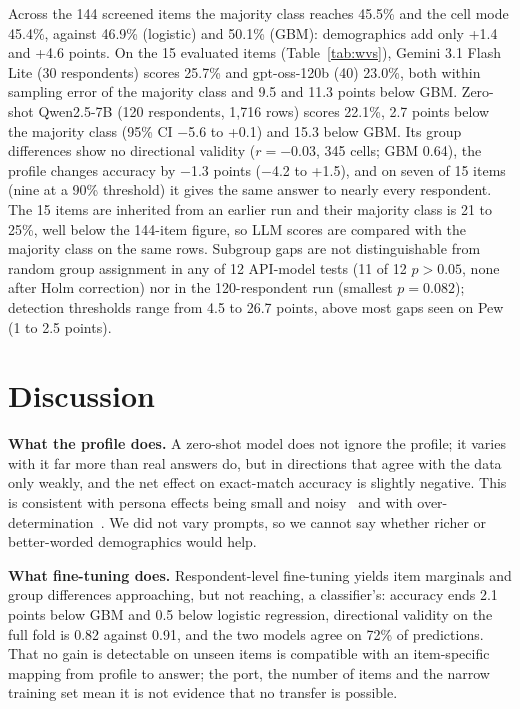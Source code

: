 \documentclass[conference]{IEEEtran}
\begin{document}
Across the 144 screened items the majority class reaches 45.5\% and the cell mode 45.4\%, against 46.9\% (logistic) and 50.1\% (GBM): demographics add only +1.4 and +4.6 points. On the 15 evaluated items (Table~\ref{tab:wvs}), Gemini 3.1 Flash Lite (30 respondents) scores 25.7\% and gpt-oss-120b (40) 23.0\%, both within sampling error of the majority class and 9.5 and 11.3 points below GBM. Zero-shot Qwen2.5-7B (120 respondents, 1{,}716 rows) scores 22.1\%, 2.7 points below the majority class (95\% CI $-$5.6 to +0.1) and 15.3 below GBM. Its group differences show no directional validity ($r={-0.03}$, 345 cells; GBM 0.64), the profile changes accuracy by $-$1.3 points ($-$4.2 to +1.5), and on seven of 15 items (nine at a 90\% threshold) it gives the same answer to nearly every respondent. The 15 items are inherited from an earlier run and their majority class is 21 to 25\%, well below the 144-item figure, so LLM scores are compared with the majority class on the same rows. Subgroup gaps are not distinguishable from random group assignment in any of 12 API-model tests (11 of 12 $p>0.05$, none after Holm correction) nor in the 120-respondent run (smallest $p=0.082$); detection thresholds range from 4.5 to 26.7 points, above most gaps seen on Pew (1 to 2.5 points).

\begin{table}[!t]
\caption{WVS-7 India, 15 items: zero-shot LLM accuracy against baselines on the same rows (95\% respondent-bootstrap CIs).}
\label{tab:wvs}
\centering
\scriptsize

\end{table}

\section{Discussion}

\textbf{What the profile does.} A zero-shot model does not ignore the profile; it varies with it far more than real answers do, but in directions that agree with the data only weakly, and the net effect on exact-match accuracy is slightly negative. This is consistent with persona effects being small and noisy~\cite{hu2024} and with over-determination~\cite{chen2026}. We did not vary prompts, so we cannot say whether richer or better-worded demographics would help.

\textbf{What fine-tuning does.} Respondent-level fine-tuning yields item marginals and group differences approaching, but not reaching, a classifier's: accuracy ends 2.1 points below GBM and 0.5 below logistic regression, directional validity on the full fold is 0.82 against 0.91, and the two models agree on 72\% of predictions. That no gain is detectable on unseen items is compatible with an item-specific mapping from profile to answer; the port, the number of items and the narrow training set mean it is not evidence that no transfer is possible.
\end{document}

